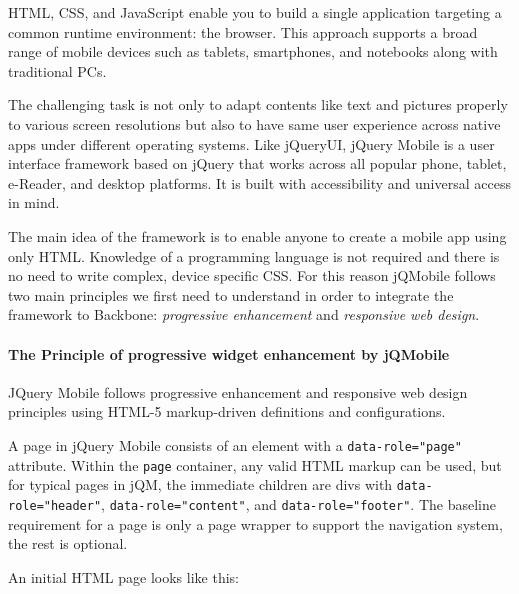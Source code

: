 \documentclass[9pt]{book}
\begin{document}
HTML, CSS, and JavaScript enable you to build a single application
targeting a common runtime environment: the browser. This approach
supports a broad range of mobile devices such as tablets, smartphones,
and notebooks along with traditional PCs.

The challenging task is not only to adapt contents like text and
pictures properly to various screen resolutions but also to have same
user experience across native apps under different operating systems.
Like jQueryUI, jQuery Mobile is a user interface framework based on
jQuery that works across all popular phone, tablet, e-Reader, and
desktop platforms. It is built with accessibility and universal access
in mind.

The main idea of the framework is to enable anyone to create a mobile
app using only HTML. Knowledge of a programming language is not required
and there is no need to write complex, device specific CSS. For this
reason jQMobile follows two main principles we first need to understand
in order to integrate the framework to Backbone: \emph{progressive
enhancement} and \emph{responsive web design}.

\paragraph{The Principle of progressive widget enhancement by
jQMobile}\label{the-principle-of-progressive-widget-enhancement-by-jqmobile}

JQuery Mobile follows progressive enhancement and responsive web design
principles using HTML-5 markup-driven definitions and configurations.

A page in jQuery Mobile consists of an element with a
\texttt{data-role="page"} attribute. Within the \texttt{page} container,
any valid HTML markup can be used, but for typical pages in jQM, the
immediate children are divs with \texttt{data-role="header"},
\texttt{data-role="content"}, and \texttt{data-role="footer"}. The
baseline requirement for a page is only a page wrapper to support the
navigation system, the rest is optional.

An initial HTML page looks like this:
\end{document}
